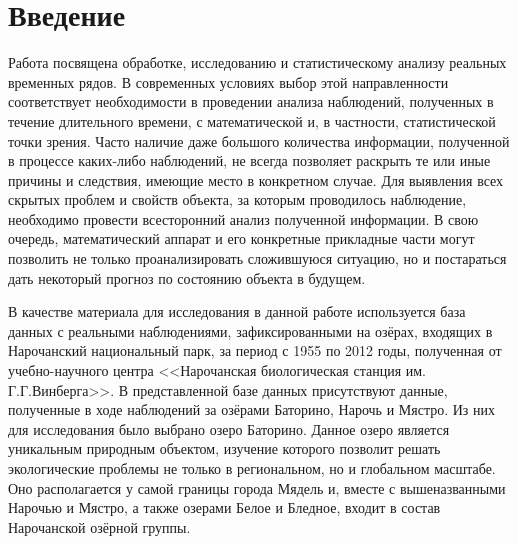 \newpage

\chapter*{Введение}

Работа посвящена обработке, исследованию и статистическому анализу реальных временных рядов. В современных условиях выбор этой направленности соответствует необходимости в проведении анализа наблюдений, полученных в течение длительного времени, с математической и, в частности, статистической точки зрения. Часто наличие даже большого количества информации, полученной в процессе каких-либо наблюдений, не всегда позволяет раскрыть те или иные причины и следствия, имеющие место в конкретном случае. Для выявления всех скрытых проблем и свойств объекта, за которым проводилось наблюдение, необходимо провести всесторонний анализ полученной информации. В свою очередь, математический аппарат и его конкретные прикладные части могут позволить не только проанализировать сложившуюся ситуацию, но и постараться дать некоторый прогноз по состоянию объекта в будущем.

В качестве материала для исследования в данной работе используется база данных с реальными наблюдениями, зафиксированными на озёрах, входящих в Нарочанский национальный парк, за период с 1955 по 2012 годы, полученная от учебно-научного центра <<Нарочанская биологическая станция им. Г.Г.Винберга>>. В представленной базе данных присутствуют данные, полученные в ходе наблюдений за озёрами Баторино, Нарочь и Мястро. Из них для исследования было выбрано озеро Баторино. Данное озеро является уникальным природным объектом, изучение которого позволит решать экологические проблемы не только в региональном, но и глобальном масштабе. Оно располагается у самой границы города Мядель и, вместе с вышеназванными Нарочью и Мястро, а также озерами Белое и Бледное, входит в состав Нарочанской озёрной группы.

